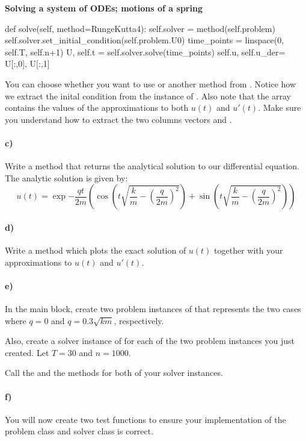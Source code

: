 \begin{Problem}{\textbf{Solving a system of ODEs; motions of a spring}}
\begin{python}
def solve(self, method=RungeKutta4):
        self.solver = method(self.problem)
        self.solver.set_initial_condition(self.problem.U0)
        time_points = linspace(0, self.T, self.n+1)
        U, self.t = self.solver.solve(time_points)
        self.u, self.u_der= U[:,0], U[:,1]
\end{python}
\noindent
 You can choose whether you want to use  or another method from . Notice how we extract the inital condition  from the  instance of . Also note that the array  contains the values of the approximations to both $u(t)$ and $u'(t)$. Make sure you understand how to extract the two columns vectors  and .

\paragraph{c)}
Write a method  that returns the analytical solution to our differential equation.
The analytic solution is given by:
$$
u(t) = \exp{-\frac{qt}{2m}}\left(\cos\left(t\sqrt{\frac{k}{m}-\left(\frac{q}{2m}\right)^2}\right) + \sin\left(t\sqrt{\frac{k}{m}-\left(\frac{q}{2m}\right)^2}\right)\right)
$$

\paragraph{d)}
Write a method  which plots the exact solution of $u(t)$ together with your approximations to $u(t)$ and $u'(t)$.

\paragraph{e)}
In the main block, create two problem instances of  that represents the two cases where $q=0$ and $q=0.3\sqrt{km}$, respectively.

Also, create a solver instance of  for each of the two problem instances you just created. Let $T=30$ and $n=1000$.

Call the  and the  methods for both of your solver instances.

\paragraph{f)}
You will now create two test functions to ensure your implementation of the problem class and solver class is correct.


\end{Problem}
